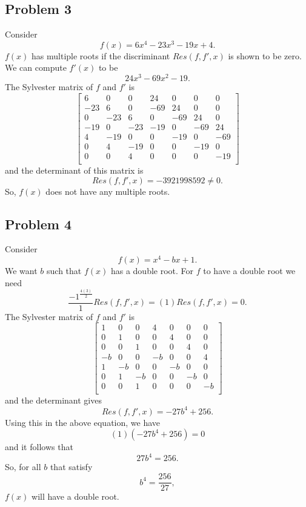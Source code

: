 \documentclass[12pt]{amsart}
\theoremstyle{case}
\begin{document}
	\subsection{Problem 3}
	Consider
	$$ f(x) = 6x^4 - 23x^3 - 19x + 4 . $$
	$f(x)$ has multiple roots if the discriminant $Res(f,f',x)$ is shown to be zero.
	We can compute $f'(x)$ to be
	$$ 24x^3 - 69x^2 - 19 . $$
	The Sylvester matrix of $f$ and $f'$ is
	\[
	\begin{bmatrix}
	6 & 0 & 0 & 24 & 0 & 0 & 0\\
	-23 & 6 & 0 & -69 & 24 & 0 & 0\\
	0 & -23 & 6 & 0 & -69 & 24 & 0\\
	-19 & 0 & -23 & -19 & 0 & -69 & 24\\
	4 & -19 & 0 & 0 & -19 & 0 & -69\\
	0 & 4 & -19 & 0 & 0 & -19 & 0\\
	0 & 0 & 4 & 0 & 0 & 0 & -19\\
	\end{bmatrix}
	\]
	and the determinant of this matrix is 
	$$Res(f,f',x) = -3921998592 \neq 0 .$$
	So, $f(x)$ does not have any multiple roots.
	
	\subsection{Problem 4}
	Consider
	$$ f(x) = x^4 - bx + 1 . $$
	We want $b$ such that $f(x)$ has a double root. For $f$ to have a double root we need
	$$\frac{-1^\frac{4(3)}{2}}{1}Res(f,f',x) = (1) Res(f,f',x) = 0 . $$
	The Sylvester matrix of $f$ and $f'$ is
	\[
	\begin{bmatrix}
	1 & 0 & 0 & 4 & 0 & 0 & 0\\
	0 & 1 & 0 & 0 & 4 & 0 & 0\\
	0 & 0 & 1 & 0 & 0 & 4 & 0\\
	-b & 0 & 0 & -b & 0 & 0 & 4\\
	1 & -b & 0 & 0 & -b & 0 & 0\\
	0 & 1 & -b & 0 & 0 & -b & 0\\
	0 & 0 & 1 & 0 & 0 & 0 & -b\\
	\end{bmatrix}
	\]
	and the determinant gives
	$$ Res(f,f',x) = -27b^4 + 256 . $$
	Using this in the above equation, we have
	$$ (1) (-27b^4 + 256) = 0 $$
	and it follows that
	$$27b^4 = 256 . $$
	So, for all $b$ that satisfy
	$$ b^4 = \frac{256}{27} , $$
	$f(x)$ will have a double root.
	
	
	
\end{document}
